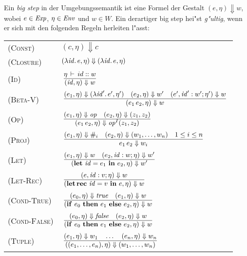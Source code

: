 \documentclass[12pt,fleqn,a4paper]{article}
\newcommand{\RN}[1]{\mbox{\textsc{(#1)}}}
\begin{document}
\begin{definition}
Ein {\em big step} in der Umgebungssemantik ist eine Formel der Gestalt $(e,\eta) \Downarrow w$,
wobei $e\in{\text{\it Exp\/}}$, $\eta\in{\text{\it Env\/}}$ und $w \in W$. Ein derartiger big step hei"st {\em g"ultig}, wenn er sich mit den
folgenden Regeln herleiten l"asst: \\[5mm]
\begin{tabular}{ll}
  \RN{Const}      & $(c,\eta) \Downarrow c$ \\[1mm]
  \RN{Closure}    & $(\lambda {\text{\it id\/}}.\,e,\eta) \Downarrow (\lambda {\text{\it id\/}}.\,e,\eta)$ \\[1mm]
  \RN{Id}         & $\regel{\Lj{\eta}{id}{w}}
                           {(\id,\eta) \Downarrow w}$ \\[3mm]
  \RN{Beta-V}     & $\regel{(e_1,\eta) \Downarrow (\abstr{\id'}{e'},\eta')
                            \quad (e_2,\eta) \Downarrow w'
                            \quad (e',\id':w';\eta') \Downarrow w}
                           {(\app{e_1}{e_2},\eta) \Downarrow w}$ \\[3mm]
  \RN{Op}         & $\regel{(e_1,\eta) \Downarrow \op \quad (e_2,\eta) \Downarrow (z_1,z_2)}
                           {(\app{e_1}{e_2},\eta) \Downarrow \op^I(z_1,z_2)}$ \\[3mm]
  \RN{Proj}       & $\regel{(e_1,\eta) \Downarrow \proj{i} \quad (e_2,\eta) \Downarrow (w_1,\ldots,w_n)
                            \quad 1 \le i \le n}
                           {\app{e_1}{e_2} \Downarrow w_i}$ \\[3mm]
  \RN{Let}        & $\regel{(e_1,\eta) \Downarrow w \quad (e_2,\id:w;\eta) \Downarrow w'}
                           {(\bli{\id}{e_1}{e_2},\eta) \Downarrow w'}$ \\[3mm]
  \RN{Let-Rec}    & $\regel{(e,\id:v;\eta) \Downarrow w}
                           {(\blri{\id}{v}{e},\eta) \Downarrow w}$ \\[3mm]
  \RN{Cond-True}  & $\regel{(e_0,\eta) \Downarrow \true \quad (e_1,\eta) \Downarrow w}
                           {(\bifte{e_0}{e_1}{e_2},\eta) \Downarrow w}$ \\[3mm]
  \RN{Cond-False} & $\regel{(e_0,\eta) \Downarrow \false \quad (e_2,\eta) \Downarrow w}
                           {(\bifte{e_0}{e_1}{e_2},\eta) \Downarrow w}$ \\[3mm]
  \RN{Tuple}      & $\regel{(e_1,\eta) \Downarrow w_1 \quad \ldots \quad (e_n,\eta) \Downarrow w_n}
                           {((e_1,\ldots,e_n),\eta) \Downarrow (w_1,\ldots,w_n)}$ \\[3mm]
\end{tabular}
\end{definition}
\end{document}
